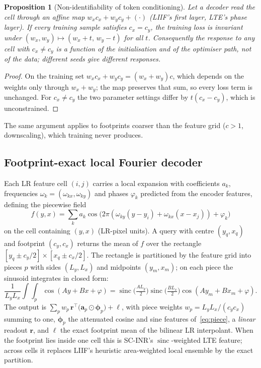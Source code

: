 \documentclass[conference]{IEEEtran}
\newtheorem{proposition}{Proposition}
\newcommand{\sinc}{\operatorname{sinc}}
\begin{document}
\begin{proposition}[Non-identifiability of token conditioning]\label{prop:ident}
Let a decoder read the cell through an affine map $w_x c_x + w_y c_y + (\cdot)$ (LIIF's first layer, LTE's phase layer). If every training sample satisfies $c_x=c_y$, the training loss is invariant under $(w_x,w_y)\mapsto(w_x+t,\,w_y-t)$ for all $t$. Consequently the response to any cell with $c_x\neq c_y$ is a function of the initialisation and of the optimiser path, not of the data; different seeds give different responses.
\end{proposition}
\begin{proof}
On the training set $w_xc_x+w_yc_y=(w_x+w_y)c$, which depends on the weights only through $w_x+w_y$; the map preserves that sum, so every loss term is unchanged. For $c_x\neq c_y$ the two parameter settings differ by $t(c_x-c_y)$, which is unconstrained.
\end{proof}
The same argument applies to footprints coarser than the feature grid ($c>1$, downscaling), which training never produces.

\subsection{Footprint-exact local Fourier decoder}
Each LR feature cell $(i,j)$ carries a local expansion with coefficients $a_k$, frequencies $\omega_k=(\omega_{kx},\omega_{ky})$ and phases $\varphi_k$ predicted from the encoder features, defining the piecewise field
\begin{equation}
f(y,x)=\sum_k a_k\cos\!\big(2\pi(\omega_{ky}(y-y_i)+\omega_{kx}(x-x_j))+\varphi_k\big)
\end{equation}
on the cell containing $(y,x)$ (LR-pixel units). A query with centre $(y_q,x_q)$ and footprint $(c_y,c_x)$ returns the mean of $f$ over the rectangle $[y_q\pm c_y/2]\times[x_q\pm c_x/2]$. The rectangle is partitioned by the feature grid into pieces $p$ with sides $(L_y,L_x)$ and midpoints $(y_m,x_m)$; on each piece the sinusoid integrates in closed form:
\begin{equation}
\frac{1}{L_yL_x}\!\int\!\!\!\int_p\!\cos(Ay+Bx+\varphi)=\sinc\!\big(\tfrac{AL_y}{2}\big)\sinc\!\big(\tfrac{BL_x}{2}\big)\cos(Ay_m+Bx_m+\varphi).
\label{eq:piece}
\end{equation}
The output is $\sum_p w_p\,\mathbf r^\top\!\big(\mathbf a_p\odot\boldsymbol\phi_p\big)+\ell$, with piece weights $w_p=L_yL_x/(c_yc_x)$ summing to one, $\boldsymbol\phi_p$ the attenuated cosine and sine features of~\eqref{eq:piece}, a \emph{linear} readout $\mathbf r$, and $\ell$ the exact footprint mean of the bilinear LR interpolant. When the footprint lies inside one cell this is SC-INR's $\sinc$-weighted LTE feature; across cells it replaces LIIF's heuristic area-weighted local ensemble by the exact partition.
\end{document}

